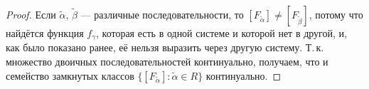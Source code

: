 \begin{proof}
     Если $\widetilde{\alpha}$, $\widetilde{\beta}$ --- различные последовательности, то $[F_{\widetilde{\alpha}}] \neq [F_{\widetilde{\beta}}]$, потому что найдётся функция $f_\gamma$, которая есть в одной системе и которой нет в другой, и, как было показано ранее, её нельзя выразить через другую систему. Т.\,к. множество двоичных последовательностей континуально, получаем, что и семейство замкнутых классов $\{[F_{\widetilde{\alpha}}]: \widetilde{\alpha} \in R\}$ континуально.
\end{proof}